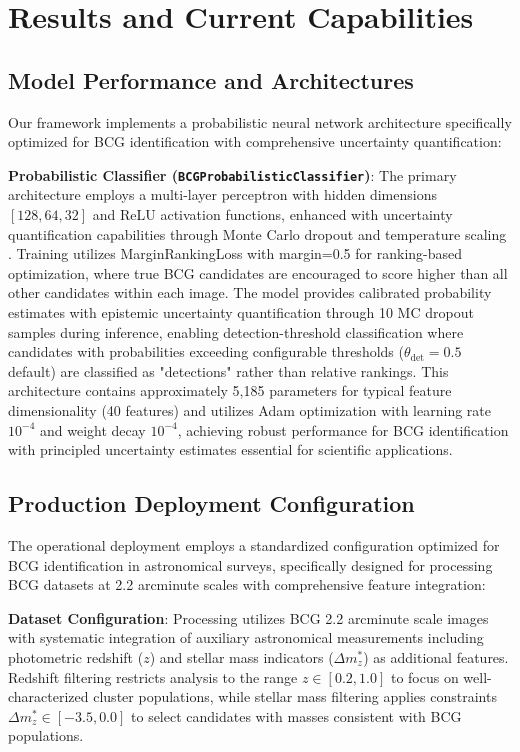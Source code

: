 \documentclass[twocolumn,10pt]{aastex631}
\begin{document}
\section{Results and Current Capabilities}

\subsection{Model Performance and Architectures}

Our framework implements a probabilistic neural network architecture specifically optimized for BCG identification with comprehensive uncertainty quantification:

\textbf{Probabilistic Classifier (\texttt{BCGProbabilisticClassifier})}: The primary architecture employs a multi-layer perceptron with hidden dimensions $[128, 64, 32]$ and ReLU activation functions, enhanced with uncertainty quantification capabilities through Monte Carlo dropout \citep{Gal2016MCDropout} and temperature scaling \citep{Laves2019WellCalibratedMU}. Training utilizes MarginRankingLoss with margin=0.5 for ranking-based optimization, where true BCG candidates are encouraged to score higher than all other candidates within each image. The model provides calibrated probability estimates with epistemic uncertainty quantification through 10 MC dropout samples during inference, enabling detection-threshold classification where candidates with probabilities exceeding configurable thresholds ($\theta_{\text{det}} = 0.5$ default) are classified as "detections" rather than relative rankings. This architecture contains approximately 5,185 parameters for typical feature dimensionality (40 features) and utilizes Adam optimization with learning rate $10^{-4}$ and weight decay $10^{-4}$, achieving robust performance for BCG identification with principled uncertainty estimates essential for scientific applications.

\subsection{Production Deployment Configuration}

The operational deployment employs a standardized configuration optimized for BCG identification in astronomical surveys, specifically designed for processing BCG datasets at 2.2 arcminute scales with comprehensive feature integration:

\textbf{Dataset Configuration}: Processing utilizes BCG 2.2 arcminute scale images with systematic integration of auxiliary astronomical measurements including photometric redshift ($z$) and stellar mass indicators ($\Delta m^*_z$) as additional features. Redshift filtering restricts analysis to the range $z \in [0.2, 1.0]$ to focus on well-characterized cluster populations, while stellar mass filtering applies constraints $\Delta m^*_z \in [-3.5, 0.0]$ to select candidates with masses consistent with BCG populations.
\end{document}
